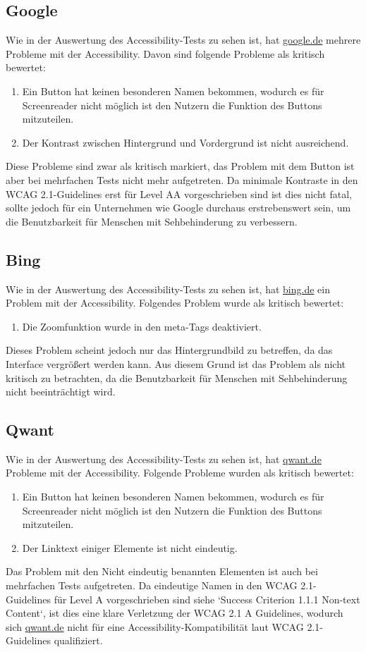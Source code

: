 \subsection{Google}\label{subsec:google}
Wie in der Auswertung des Accessibility-Tests zu sehen ist, hat \url{google.de} mehrere Probleme mit der Accessibility.
Davon sind folgende Probleme als kritisch bewertet:
\begin{enumerate}
    \item Ein Button hat keinen besonderen Namen bekommen, wodurch es für Screenreader nicht möglich ist den Nutzern die Funktion des Buttons mitzuteilen.
    \item Der Kontrast zwischen Hintergrund und Vordergrund ist nicht ausreichend.
\end{enumerate}
Diese Probleme sind zwar als kritisch markiert, das Problem mit dem Button ist aber bei mehrfachen Tests nicht mehr aufgetreten.
Da minimale Kontraste in den WCAG 2.1-Guidelines erst für Level AA vorgeschrieben sind ist dies nicht fatal, sollte jedoch für ein Unternehmen wie Google durchaus erstrebenswert sein,
um die Benutzbarkeit für Menschen mit Sehbehinderung zu verbessern.

\subsection{Bing}\label{subsec:bing}
Wie in der Auswertung des Accessibility-Tests zu sehen ist, hat \url{bing.de} ein Problem mit der Accessibility.
Folgendes Problem wurde als kritisch bewertet:
\begin{enumerate}
    \item Die Zoomfunktion wurde in den meta-Tags deaktiviert.
\end{enumerate}
Dieses Problem scheint jedoch nur das Hintergrundbild zu betreffen, da das Interface vergrößert werden kann.
Aus diesem Grund ist das Problem als nicht kritisch zu betrachten, da die Benutzbarkeit für Menschen mit Sehbehinderung nicht beeinträchtigt wird.

\subsection{Qwant}\label{subsec:qwant}
Wie in der Auswertung des Accessibility-Tests zu sehen ist, hat \url{qwant.de} Probleme mit der Accessibility.
Folgende Probleme wurden als kritisch bewertet:
\begin{enumerate}
    \item Ein Button hat keinen besonderen Namen bekommen, wodurch es für Screenreader nicht möglich ist den Nutzern die Funktion des Buttons mitzuteilen.
    \item Der Linktext einiger Elemente ist nicht eindeutig.
\end{enumerate}
Das Problem mit den Nicht eindeutig benannten Elementen ist auch bei mehrfachen Tests aufgetreten.
Da eindeutige Namen in den WCAG 2.1-Guidelines für Level A vorgeschrieben sind siehe `Success Criterion 1.1.1 Non-text Content`\autocite{WCAG21},
ist dies eine klare Verletzung der WCAG 2.1 A Guidelines, wodurch sich \url{qwant.de} nicht für eine Accessibility-Kompatibilität laut WCAG 2.1-Guidelines qualifiziert.


